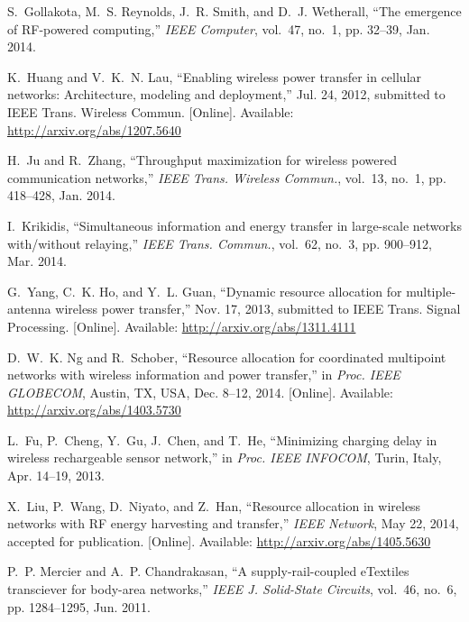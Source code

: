 \documentclass[11pt,draftclsnofoot,journal,onecolumn]{IEEEtran}
\begin{document}
\begin{thebibliography}{10}
{
S.~{Gollakota}, M.~S. {Reynolds}, J.~R. {Smith}, and D.~J. {Wetherall}, ``The
  emergence of {RF}-powered computing,'' \emph{{IEEE} Computer}, vol.~47,
  no.~1, pp. 32--39, Jan. 2014.

\BIBentryALTinterwordspacing
K.~{Huang} and V.~K.~N. {Lau}, ``Enabling wireless power transfer in cellular
  networks: Architecture, modeling and deployment,'' Jul. 24, 2012, submitted
  to {IEEE} Trans. Wireless Commun. [Online]. Available:
  \url{http://arxiv.org/abs/1207.5640}
\BIBentrySTDinterwordspacing

H.~{Ju} and R.~{Zhang}, ``Throughput maximization for wireless powered
  communication networks,'' \emph{{IEEE} Trans. Wireless Commun.}, vol.~13,
  no.~1, pp. 418--428, Jan. 2014.

I.~{Krikidis}, ``Simultaneous information and energy transfer in large-scale
  networks with/without relaying,'' \emph{{IEEE} Trans. Commun.}, vol.~62,
  no.~3, pp. 900--912, Mar. 2014.

\BIBentryALTinterwordspacing
G.~{Yang}, C.~K. {Ho}, and Y.~L. {Guan}, ``Dynamic resource allocation for
  multiple-antenna wireless power transfer,'' Nov. 17, 2013, submitted to
  {IEEE} Trans. Signal Processing. [Online]. Available:
  \url{http://arxiv.org/abs/1311.4111}
\BIBentrySTDinterwordspacing

\BIBentryALTinterwordspacing
D.~W.~K. {Ng} and R.~{Schober}, ``Resource allocation for coordinated
  multipoint networks with wireless information and power transfer,'' in
  \emph{Proc. IEEE GLOBECOM}, Austin, TX, USA, Dec. 8--12, 2014. [Online].
  Available: \url{http://arxiv.org/abs/1403.5730}
\BIBentrySTDinterwordspacing

L.~{Fu}, P.~{Cheng}, Y.~{Gu}, J.~{Chen}, and T.~{He}, ``Minimizing charging
  delay in wireless rechargeable sensor network,'' in \emph{Proc. IEEE
  INFOCOM}, Turin, Italy, Apr. 14--19, 2013.

\BIBentryALTinterwordspacing
X.~{Liu}, P.~{Wang}, D.~{Niyato}, and Z.~{Han}, ``Resource allocation in
  wireless networks with {RF} energy harvesting and transfer,'' \emph{{IEEE}
  Network}, May 22, 2014, accepted for publication. [Online]. Available:
  \url{http://arxiv.org/abs/1405.5630}
\BIBentrySTDinterwordspacing

P.~P. {Mercier} and A.~P. Chandrakasan, ``A supply-rail-coupled {eTextiles}
  transciever for body-area networks,'' \emph{{IEEE} J. Solid-State Circuits},
  vol.~46, no.~6, pp. 1284--1295, Jun. 2011.

}
\end{thebibliography}
\end{document}
